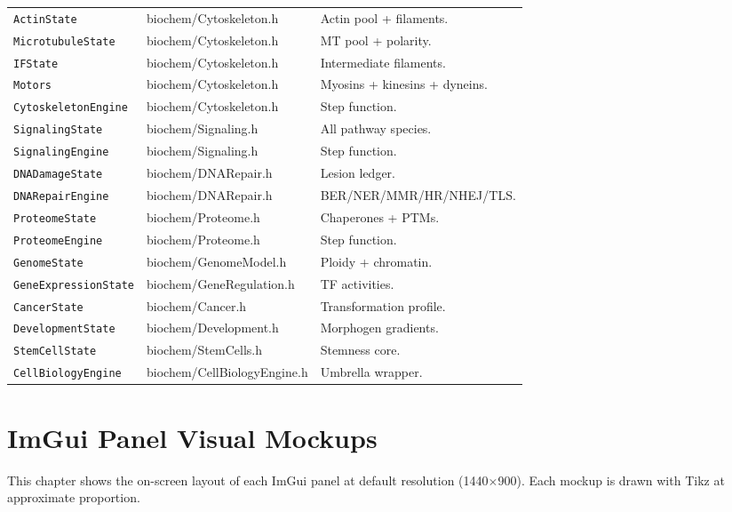 \documentclass[11pt,letterpaper,twoside,openany]{book}
\newcommand{\code}[1]{\texttt{#1}}
\begin{document}
\begin{longtable}{p{4.4cm}p{3.0cm}p{7.0cm}}
\code{ActinState}         & biochem/Cytoskeleton.h              & Actin pool + filaments.\\
\code{MicrotubuleState}   & biochem/Cytoskeleton.h              & MT pool + polarity.\\
\code{IFState}            & biochem/Cytoskeleton.h              & Intermediate filaments.\\
\code{Motors}             & biochem/Cytoskeleton.h              & Myosins + kinesins + dyneins.\\
\code{CytoskeletonEngine} & biochem/Cytoskeleton.h              & Step function.\\
\code{SignalingState}     & biochem/Signaling.h                 & All pathway species.\\
\code{SignalingEngine}    & biochem/Signaling.h                 & Step function.\\
\code{DNADamageState}     & biochem/DNARepair.h                 & Lesion ledger.\\
\code{DNARepairEngine}    & biochem/DNARepair.h                 & BER/NER/MMR/HR/NHEJ/TLS.\\
\code{ProteomeState}      & biochem/Proteome.h                  & Chaperones + PTMs.\\
\code{ProteomeEngine}     & biochem/Proteome.h                  & Step function.\\
\code{GenomeState}        & biochem/GenomeModel.h               & Ploidy + chromatin.\\
\code{GeneExpressionState}& biochem/GeneRegulation.h            & TF activities.\\
\code{CancerState}        & biochem/Cancer.h                    & Transformation profile.\\
\code{DevelopmentState}   & biochem/Development.h               & Morphogen gradients.\\
\code{StemCellState}      & biochem/StemCells.h                 & Stemness core.\\
\code{CellBiologyEngine}  & biochem/CellBiologyEngine.h         & Umbrella wrapper.\\
\bottomrule
\end{longtable}

\chapter{ImGui Panel Visual Mockups}
\label{ch:ui-mockups}

This chapter shows the on-screen layout of each ImGui panel at
default resolution (1440$\times$900). Each mockup is drawn with
Tikz at approximate proportion.
\end{document}
